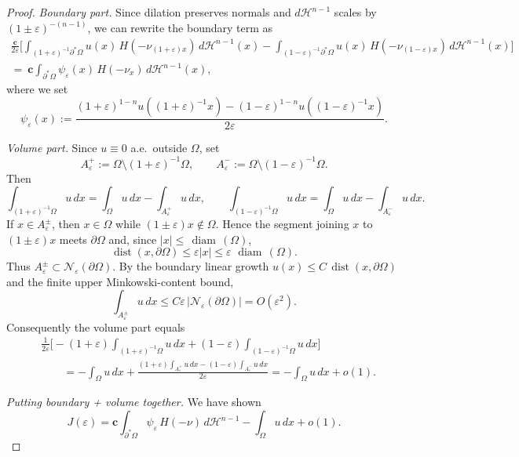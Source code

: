 \documentclass[reqno,11pt]{amsart}
\def\dist{{\mathop\mathrm{dist}}}
\def\diam{{\mathop\mathrm{\,diam\,}}}
\numberwithin{equation}{section}
\theoremstyle{remark}
\begin{document}
\begin{proof}
\smallskip
\noindent\emph{Boundary part.}
Since dilation preserves normals and $d\mathscr H^{n-1}$ scales by $(1\pm\varepsilon)^{-(n-1)}$, we can rewrite the boundary term as
\begin{multline*}
\frac{\mathbf c}{2\varepsilon}\Bigg[
{\int_{(1+\varepsilon)^{-1}\partial^*\Omega} u(x)\,H(-\nu_{(1+\varepsilon)x})\, d\mathscr H^{n-1}(x)
-\int_{(1-\varepsilon)^{-1}\partial^*\Omega} u(x)\,H(-\nu_{(1-\varepsilon)x})\, d\mathscr H^{n-1}(x)}
\Bigg]\\
=\ {\mathbf c\int_{\partial^*\Omega}\psi_\varepsilon(x)\,H(-\nu_x)\,d\mathscr H^{n-1}(x),}
\end{multline*}
where we set
\begin{equation}\label{def:psi-eps}
\psi_\varepsilon(x):=
{\frac{(1+\varepsilon)^{1-n}u((1+\varepsilon)^{-1}x)-(1-\varepsilon)^{1-n}u((1-\varepsilon)^{-1}x)}{2\varepsilon}.}
\end{equation}

\smallskip
\noindent\emph{Volume part.}
{Since $u\equiv0$ a.e.\ outside $\Omega$, set}
\[
{
A_\varepsilon^+:=\Omega\setminus (1+\varepsilon)^{-1}\Omega,\qquad
A_\varepsilon^-:=\Omega\setminus (1-\varepsilon)^{-1}\Omega .
}
\]
{Then}
\[
{
\int_{(1+\varepsilon)^{-1}\Omega}u\,dx=\int_\Omega u\,dx-\int_{A_\varepsilon^+}u\,dx,\qquad
\int_{(1-\varepsilon)^{-1}\Omega}u\,dx=\int_\Omega u\,dx-\int_{A_\varepsilon^-}u\,dx .
}
\]
{If $x\in A_\varepsilon^\pm$, then $x\in\Omega$ while $(1\pm\varepsilon)x\notin\Omega$. Hence the segment joining
$x$ to $(1\pm\varepsilon)x$ meets $\partial\Omega$ and, since $|x|\le\diam(\Omega)$,}
\[
{
\dist(x,\partial\Omega)\le \varepsilon |x|\le \varepsilon\,\diam(\Omega).
}
\]
{Thus $A_\varepsilon^\pm\subset\mathcal N_\varepsilon(\partial\Omega)$. By the boundary linear growth
$u(x)\le C\,\dist(x,\partial\Omega)$ and the finite upper Minkowski-content bound,}
\[
{
\int_{A_\varepsilon^\pm}u\,dx\le C\varepsilon\,|\mathcal N_\varepsilon(\partial\Omega)|=O(\varepsilon^2).
}
\]
{Consequently the volume part equals}
\begin{align*}
&\frac{1}{2\varepsilon}\Bigg[
-(1+\varepsilon)\int_{(1+\varepsilon)^{-1}\Omega}u\,dx
+(1-\varepsilon)\int_{(1-\varepsilon)^{-1}\Omega}u\,dx
\Bigg]\\
&\qquad= -\int_\Omega u\,dx
+\frac{(1+\varepsilon)\int_{A_\varepsilon^+}u\,dx
-(1-\varepsilon)\int_{A_\varepsilon^-}u\,dx}{2\varepsilon}
=-\int_\Omega u\,dx+o(1).
\end{align*}

\smallskip
\noindent\emph{Putting boundary + volume together.}
We have shown
\begin{equation}\label{eq:Jeps}
J(\varepsilon)=\mathbf c\int_{\partial^*\Omega}\psi_\varepsilon\,H(-\nu)\,d\mathscr H^{n-1}
-\int_\Omega u\,dx + o(1).
\end{equation}


\end{proof}
\end{document}
